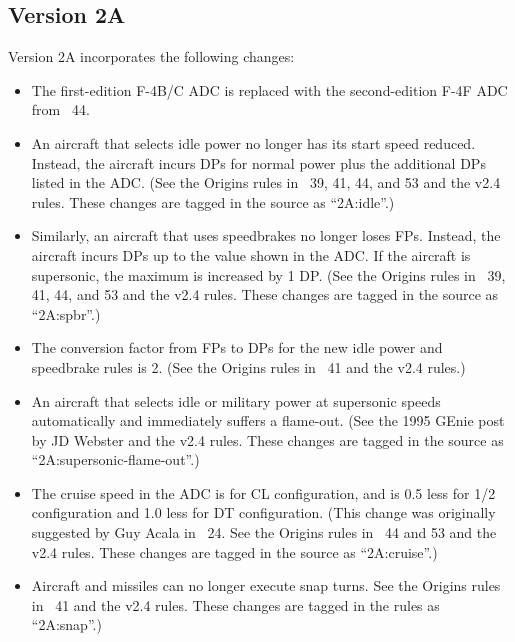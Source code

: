 \documentclass[10pt]{article}
\begin{document}
\subsection{Version 2A}

Version 2A incorporates the following changes:

\begin{itemize}

    \item The first-edition F-4B/C ADC is replaced with the second-edition F-4F ADC from {\APJ}~44.

    \item An aircraft that selects idle power no longer has its start speed reduced. Instead, the aircraft incurs DPs for normal power plus the additional DPs listed in the ADC. (See the Origins rules in {\APJ}~39, 41, 44, and 53 and the v2.4 rules. These changes are tagged in the source as “2A:idle”.) 

    \item Similarly, an aircraft that uses speedbrakes no longer loses FPs. Instead, the aircraft incurs DPs up to the value shown in the ADC. If the aircraft is supersonic, the maximum is increased by 1 DP. (See the Origins rules in {\APJ}~39, 41, 44, and 53 and the v2.4 rules. These changes are tagged in the source as “2A:spbr”.) 

    \item The conversion factor from FPs to DPs for the new idle power and speedbrake rules is 2. (See the Origins rules in {\APJ}~41 and the v2.4 rules.)

    \item An aircraft that selects idle or military power at supersonic speeds automatically and immediately suffers a flame-out. (See the 1995 GEnie post by JD Webster and the v2.4 rules. These changes are tagged in the source as “2A:supersonic-flame-out”.)

    \item The cruise speed in the ADC is for CL configuration, and is 0.5 less for 1/2 configuration and 1.0 less for DT configuration. (This change was originally suggested by Guy Acala in {\APJ}~24. See the Origins rules in {\APJ}~44 and 53 and the v2.4 rules. These changes are tagged in the source as “2A:cruise”.) 

    \item Aircraft and missiles can no longer execute snap turns. See the Origins rules in {\APJ}~41 and the v2.4 rules. These changes are tagged in the rules as “2A:snap”.)


\end{itemize}
\end{document}

